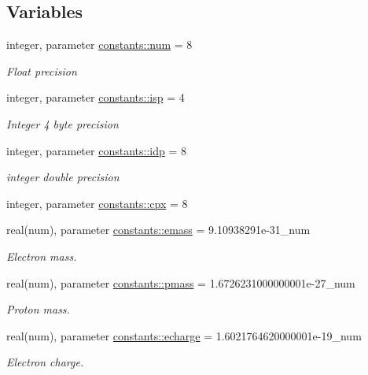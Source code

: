 \subsection*{Variables}
\begin{DoxyCompactItemize}
\item 
integer, parameter \hyperlink{namespaceconstants_afe19f7f8af171411c51fb763b36e3823}{constants\+::num} = 8
\begin{DoxyCompactList}\small\item\em Float precision \end{DoxyCompactList}\item 
integer, parameter \hyperlink{namespaceconstants_a5a2ae450a00d2a29f9b70dcb776f7a2f}{constants\+::isp} = 4
\begin{DoxyCompactList}\small\item\em Integer 4 byte precision \end{DoxyCompactList}\item 
integer, parameter \hyperlink{namespaceconstants_ae345db51770e3628e6aaf76e6a45e160}{constants\+::idp} = 8
\begin{DoxyCompactList}\small\item\em integer double precision \end{DoxyCompactList}\item 
integer, parameter \hyperlink{namespaceconstants_a5709f0ae2ee52b1906446ad25ed0f587}{constants\+::cpx} = 8
\item 
real(num), parameter \hyperlink{namespaceconstants_ad39536f583f0861abb2fb19a27c56fc8}{constants\+::emass} = 9.\+10938291e-\/31\+\_\+num
\begin{DoxyCompactList}\small\item\em Electron mass. \end{DoxyCompactList}\item 
real(num), parameter \hyperlink{namespaceconstants_a44f3d8cbf9c39db63d7533d985cc51c3}{constants\+::pmass} = 1.\+6726231000000001e-\/27\+\_\+num
\begin{DoxyCompactList}\small\item\em Proton mass. \end{DoxyCompactList}\item 
real(num), parameter \hyperlink{namespaceconstants_af0f1098f6be55eab4174890ed5caaf98}{constants\+::echarge} = 1.\+6021764620000001e-\/19\+\_\+num
\begin{DoxyCompactList}\small\item\em Electron charge. \end{DoxyCompactList}\item 

\end{DoxyCompactItemize}

